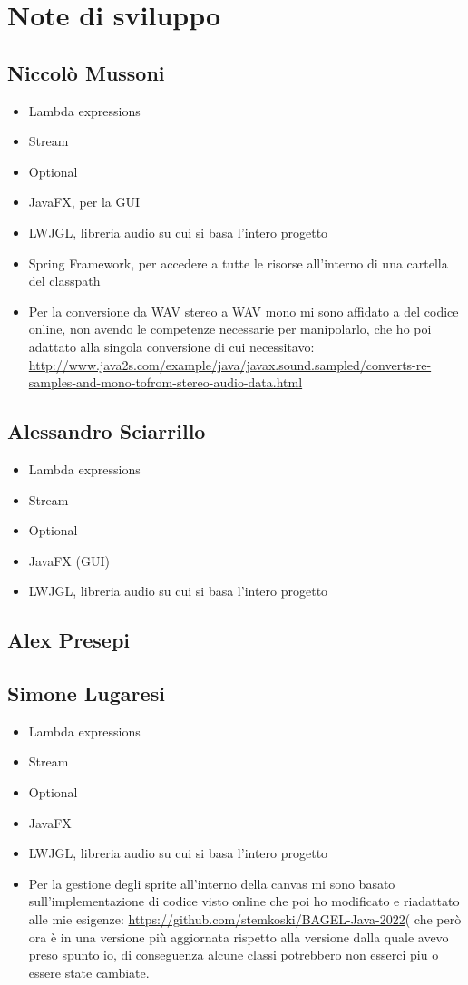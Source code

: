 \documentclass[a4paper,12pt]{report}
\begin{document}
\section{Note di sviluppo}
\subsection*{Niccolò Mussoni}
\begin{itemize}
	\item Lambda expressions
	\item Stream
	\item Optional
	\item JavaFX, per la GUI
	\item LWJGL, libreria audio su cui si basa l’intero progetto
	\item Spring Framework, per accedere a tutte le risorse all’interno di una cartella del classpath
	\item Per la conversione da WAV stereo a WAV mono mi sono affidato a del codice online, non avendo le competenze necessarie per manipolarlo, che ho poi adattato alla singola conversione di cui necessitavo: \url{http://www.java2s.com/example/java/javax.sound.sampled/converts-re-samples-and-mono-tofrom-stereo-audio-data.html}
\end{itemize}
\subsection*{Alessandro Sciarrillo}
\begin{itemize}
	\item Lambda expressions
	\item Stream
	\item Optional
	\item JavaFX (GUI)
	\item LWJGL, libreria audio su cui si basa l’intero progetto
\end{itemize}
\subsection*{Alex Presepi}
\subsection*{Simone Lugaresi}
\begin{itemize}
	\item Lambda expressions
	\item Stream
	\item Optional
	\item JavaFX
	\item LWJGL, libreria audio su cui si basa l’intero progetto
	\item Per la gestione degli sprite all'interno della canvas mi sono basato sull'implementazione di codice visto online che poi ho modificato e riadattato alle mie esigenze: \url{https://github.com/stemkoski/BAGEL-Java-2022}( che però ora è in una versione più aggiornata rispetto alla versione dalla quale avevo preso spunto io, di conseguenza alcune classi potrebbero non esserci piu o essere state cambiate.
\end{itemize}
\end{document}
